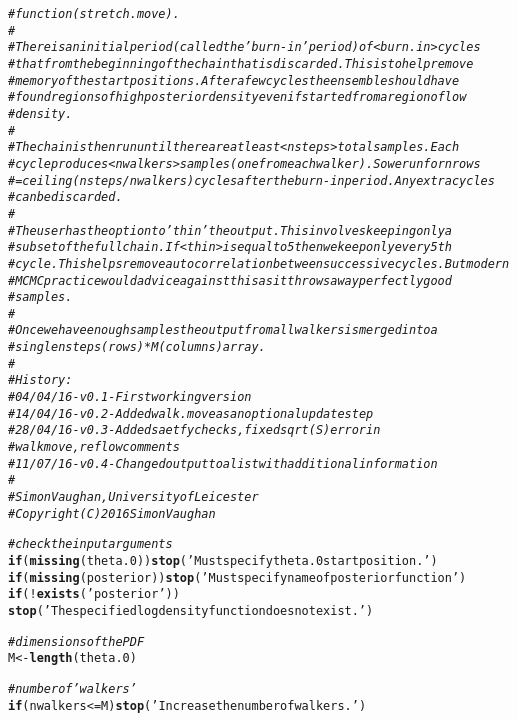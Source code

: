 \documentclass{article}\usepackage[]{graphicx}\usepackage[]{color}
\makeatletter
\newcommand{\hlstr}[1]{\textcolor[rgb]{0.192,0.494,0.8}{#1}}%
\newcommand{\hlcom}[1]{\textcolor[rgb]{0.678,0.584,0.686}{\textit{#1}}}%
\newcommand{\hlopt}[1]{\textcolor[rgb]{0,0,0}{#1}}%
\newcommand{\hlstd}[1]{\textcolor[rgb]{0.345,0.345,0.345}{#1}}%
\newcommand{\hlkwa}[1]{\textcolor[rgb]{0.161,0.373,0.58}{\textbf{#1}}}%
\newcommand{\hlkwb}[1]{\textcolor[rgb]{0.69,0.353,0.396}{#1}}%
\newcommand{\hlkwd}[1]{\textcolor[rgb]{0.737,0.353,0.396}{\textbf{#1}}}%
\newenvironment{kframe}{%
 \def\at@end@of@kframe{}%
 \ifinner\ifhmode%
  \def\at@end@of@kframe{\end{minipage}}%
  \begin{minipage}{\columnwidth}%
 \fi\fi%
 \def\FrameCommand##1{\hskip\@totalleftmargin \hskip-\fboxsep
 \colorbox{shadecolor}{##1}\hskip-\fboxsep
     \hskip-\linewidth \hskip-\@totalleftmargin \hskip\columnwidth}%
 \MakeFramed {\advance\hsize-\width
   \@totalleftmargin\z@ \linewidth\hsize
   \@setminipage}}%
 {\par\unskip\endMakeFramed%
 \at@end@of@kframe}
\newenvironment{knitrout}{}{} %
\makeatother
\begin{document}
\begin{knitrout}
\begin{kframe}
\begin{alltt}
\hlcom{# function (stretch.move).}
\hlcom{# }
\hlcom{# There is an initial period (called the 'burn-in' period) of <burn.in> cycles }
\hlcom{# that from the beginning of the chain that is discarded. This is to help remove}
\hlcom{# memory of the start positions. After a few cycles the ensemble should have }
\hlcom{# found regions of high posterior density even if started from a region of low }
\hlcom{# density.}
\hlcom{# }
\hlcom{# The chain is then run until there are at least <nsteps> total samples. Each }
\hlcom{# cycle produces <nwalkers> samples (one from each walker). So we run for nrows }
\hlcom{# = ceiling(nsteps/nwalkers) cycles after the burn-in period. Any extra cycles }
\hlcom{# can be discarded.}
\hlcom{# }
\hlcom{# The user has the option to 'thin' the output. This involves keeping only a }
\hlcom{# subset of the full chain. If <thin> is equal to 5 then we keep only every 5th }
\hlcom{# cycle. This helps remove autocorrelation between successive cycles. But modern}
\hlcom{# MCMC practice would advice against this as it throws away perfectly good }
\hlcom{# samples.}
\hlcom{# }
\hlcom{# Once we have enough samples the output from all walkers is merged into a}
\hlcom{# single nsteps (rows) * M (columns) array.}
\hlcom{#}
\hlcom{# History:}
\hlcom{#  04/04/16 - v0.1 - First working version}
\hlcom{#  14/04/16 - v0.2 - Added walk.move as an optional update step}
\hlcom{#  28/04/16 - v0.3 - Added saetfy checks, fixed sqrt(S) error in }
\hlcom{#                     walk move, reflow comments}
\hlcom{#  11/07/16 - v0.4 - Changed output to a list with additional information}
\hlcom{#}
\hlcom{# Simon Vaughan, University of Leicester}
\hlcom{# Copyright (C) 2016 Simon Vaughan}

  \hlcom{# check the input arguments}
  \hlkwa{if} \hlstd{(}\hlkwd{missing}\hlstd{(theta.0))} \hlkwd{stop}\hlstd{(}\hlstr{'Must specify theta.0 start position.'}\hlstd{)}
  \hlkwa{if} \hlstd{(}\hlkwd{missing}\hlstd{(posterior))} \hlkwd{stop}\hlstd{(}\hlstr{'Must specify name of posterior function'}\hlstd{)}
  \hlkwa{if} \hlstd{(}\hlopt{!}\hlkwd{exists}\hlstd{(}\hlstr{'posterior'}\hlstd{))}
    \hlkwd{stop}\hlstd{(}\hlstr{'The specified log density function does not exist.'}\hlstd{)}

  \hlcom{# dimensions of the PDF}
  \hlstd{M} \hlkwb{<-} \hlkwd{length}\hlstd{(theta.0)}

  \hlcom{# number of 'walkers'}
  \hlkwa{if} \hlstd{(nwalkers} \hlopt{<=} \hlstd{M)} \hlkwd{stop}\hlstd{(}\hlstr{'Increase the number of walkers.'}\hlstd{)}


\end{alltt}
\end{kframe}
\end{knitrout}
\end{document}
